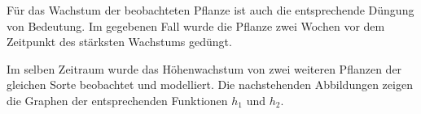 \begin{langesbeispiel}
\begin{aufgabenstellung}
\item %


\item %


\item Für das Wachstum der beobachteten Pflanze ist auch die entsprechende Düngung von Bedeutung. Im gegebenen Fall wurde die Pflanze zwei Wochen vor dem Zeitpunkt des stärksten Wachstums gedüngt.%


\item Im selben Zeitraum wurde das Höhenwachstum von zwei weiteren Pflanzen der gleichen Sorte beobachtet und modelliert. Die nachstehenden Abbildungen zeigen die Graphen der
entsprechenden Funktionen $h_1$ und $h_2$.


\end{aufgabenstellung}
\end{langesbeispiel}

